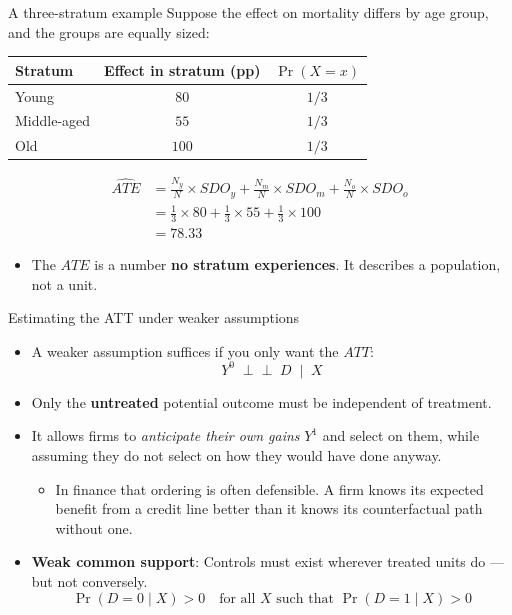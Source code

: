 \documentclass[
  11pt,
  ignorenonframetext,
  aspectratio=169,
]{beamer}
\providecommand{\tightlist}{%
  \setlength{\itemsep}{0pt}\setlength{\parskip}{0pt}}
\newcommand{\indep}{\perp\!\!\!\perp}
\begin{document}
\begin{frame}{A three-stratum example}
\protect{}\label{a-three-stratum-example}
Suppose the effect on mortality differs by age group, and the groups are
equally sized:

\begin{center}
\begin{tabular}{lcc}
\toprule
Stratum & Effect in stratum (pp) & $\Pr(X = x)$ \\
\midrule
Young       & $80$  & $1/3$ \\
Middle-aged & $55$  & $1/3$ \\
Old         & $100$ & $1/3$ \\
\bottomrule
\end{tabular}
\end{center}

\[
\begin{aligned}
  \widehat{\mathit{ATE}} &= \frac{N_y}{N} \times SDO_{y} +
  \frac{N_m}{N} \times SDO_{m} + \frac{N_o}{N} \times SDO_{o} \\
  &= \frac{1}{3} \times 80 + \frac{1}{3} \times 55 + \frac{1}{3} \times 100 \\
  &= 78.33
\end{aligned}
\]

\begin{itemize}
\tightlist
\item
  The \(ATE\) is a number \textbf{no stratum experiences}. It describes
  a population, not a unit.
\end{itemize}
\end{frame}

\begin{frame}{Estimating the ATT under weaker assumptions}
\protect{}\label{estimating-the-att-under-weaker-assumptions}
\begin{itemize}
\tightlist
\item
  A weaker assumption suffices if you only want the \(ATT\): \[
  Y^0 \;\indep\; D \;\mid\; X
  \]
\item
  Only the \textbf{untreated} potential outcome must be independent of
  treatment.
\item
  It allows firms to \emph{anticipate their own gains} \(Y^1\) and
  select on them, while assuming they do not select on how they would
  have done anyway.

  \begin{itemize}
  \tightlist
  \item
    In finance that ordering is often defensible. A firm knows its
    expected benefit from a credit line better than it knows its
    counterfactual path without one.
  \end{itemize}
\item
  \textbf{Weak common support}: Controls must exist wherever treated
  units do --- but not conversely. \[
  \Pr(D = 0 \mid X) > 0 \quad \text{for all } X \text{ such that }
  \Pr(D = 1 \mid X) > 0 
  \]
\end{itemize}
\end{frame}
\end{document}
